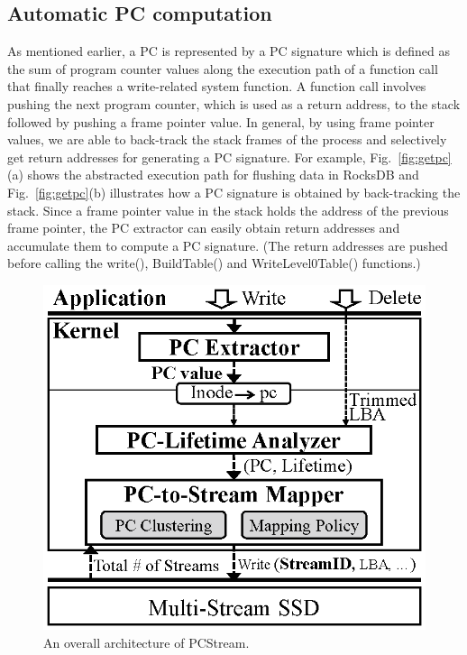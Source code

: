 \subsection{Automatic PC computation}
As mentioned earlier, a PC is represented by a PC signature which is defined as
the sum of program counter values along the execution path of a function call that
finally reaches a write-related system function. A function call involves
pushing the next program counter, which is used as a return address, to the
stack followed by pushing a frame pointer value.  In general, by using frame
pointer values, we are able to back-track the stack frames of the process and
selectively get return addresses for generating a PC signature.  For example,
Fig.~\ref{fig:getpc}(a) shows the abstracted execution path for flushing data
in RocksDB and Fig.~\ref{fig:getpc}(b) illustrates how a PC signature is obtained
by back-tracking the stack.  
Since a frame pointer value in the stack holds the address of the previous
frame pointer, the PC extractor can easily obtain return addresses and
accumulate them to compute a PC signature. (The return addresses are pushed
before calling the \textsf{\small  write()}, \textsf{\small  BuildTable()} and \textsf{\small 
WriteLevel0Table()} functions.)

\begin{figure}[t]
	\centering
	\vspace{-7pt}
	\includegraphics[width=0.6\linewidth]{figure/architecture4}
	\vspace{-10pt}
	\caption{An overall architecture of \textsf{\small PCStream}.}
	\label{fig:architecture}
	\vspace{-15pt}
\end{figure}


